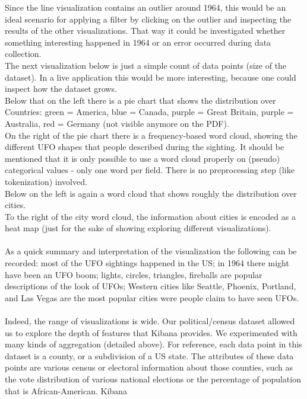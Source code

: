 \documentclass[bibliography=totoc]{article}
\begin{document}
Since the line visualization contains an outlier around 1964, this would
be an ideal scenario for applying a filter by clicking on the outlier and inspecting the results of the other
visualizations. That way
it could be investigated whether something interesting happened in 1964 or
an error occurred during data collection.
\\
The next visualization below is just a simple count of data points (size of the dataset). 
In a live application this would be more interesting, because one could inspect how the 
dataset grows.
\\
Below that on the left there is a pie chart that shows the distribution over Countries:
green = America, blue = Canada, purple = Great Britain, purple = Australia, red = Germany (not visible anymore on the PDF).
\\
On the right of the pie chart there is a frequency-based word cloud, showing the different UFO shapes that 
people described during the sighting. It should be mentioned that it is only possible to
use a word cloud properly on (pseudo) categorical values - only one word per field.
There is no preprocessing step
(like tokenization) involved.
\\
Below on the left is again a word cloud that shows roughly the distribution over cities.
\\
To the right of the city word cloud, the information about cities is encoded as a 
heat map (just for the sake of showing exploring different visualizations).
\\
\\
As a quick summary and interpretation of the visualization the following can 
be recorded: most of the UFO sightings happened in the US; in 1964 there might have been 
an UFO boom; lights, circles, triangles, fireballs are popular descriptions of the look of UFOs;
Western cities like Seattle, Phoenix, Portland, and Las Vegas are the most popular cities were people claim
to have seen UFOs.
\\
\\
Indeed, the range of visualizations is wide. Our political/census dataset allowed us to explore the depth
of features that Kibana provides. We experimented with many kinds of aggregation (detailed above). For
reference, each data point in this dataset is a county, or a subdivision of a US state. The attributes of
these data points are various census or electoral information about those counties, such as the vote
distribution of various national elections or the percentage of population that is African-American. Kibana
\end{document}
